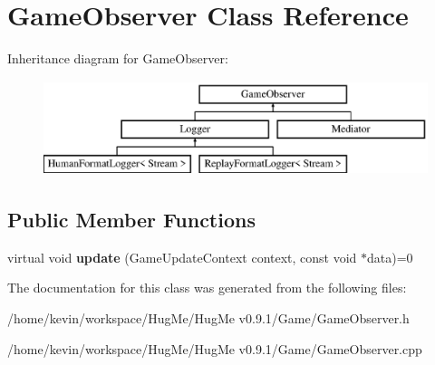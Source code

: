 \hypertarget{classGameObserver}{
\section{GameObserver Class Reference}
\label{classGameObserver}
}
Inheritance diagram for GameObserver:\begin{figure}[H]
\begin{center}
\leavevmode
\includegraphics[height=2.78607cm]{classGameObserver}
\end{center}
\end{figure}
\subsection*{Public Member Functions}
\begin{DoxyCompactItemize}
\item 
\hypertarget{classGameObserver_a591f784a0e6b57169f210ae873d5c122}{
virtual void {\bfseries update} (GameUpdateContext context, const void $\ast$data)=0}
\label{classGameObserver_a591f784a0e6b57169f210ae873d5c122}

\end{DoxyCompactItemize}


The documentation for this class was generated from the following files:\begin{DoxyCompactItemize}
\item 
/home/kevin/workspace/HugMe/HugMe v0.9.1/Game/GameObserver.h\item 
/home/kevin/workspace/HugMe/HugMe v0.9.1/Game/GameObserver.cpp\end{DoxyCompactItemize}
